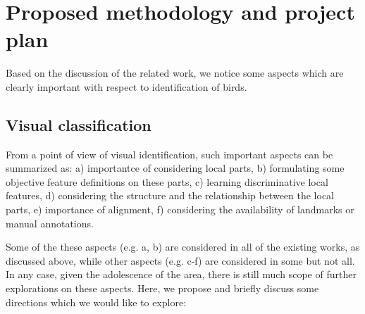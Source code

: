 \documentclass{article}
\begin{document}
\section{Proposed methodology and project plan}

Based on the discussion of the related work, we notice some aspects which are
clearly important with respect to identification of birds.

\subsection{Visual classification}
\label{subsec:visual}

From a point of view of visual identification, such important aspects can be summarized as: a)
importantce of considering local parts, b) formulating some objective feature
definitions on these parts, c) learning discriminative local features, d)
considering the structure and the relationship between the local parts, e)
importance of alignment, f) considering the availability of landmarks or manual
annotations. 

Some of the these aspects (e.g. a, b) are considered  in all of the existing
works, as discussed above, while other aspects (e.g. c-f)  are considered in
some but not all. In any case, given the adolescence of the area, there is still
much scope of further explorations on these aspects. Here, we propose and
briefly discuss some directions which we would like to explore: 
\end{document}
